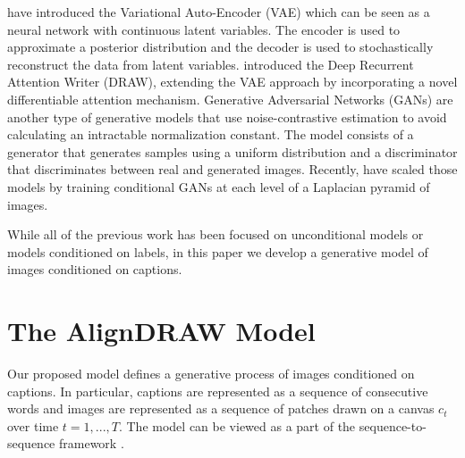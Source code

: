 \documentclass{article} %
\newcommand{\icaption}{{\bf{y}}}
\newcommand{\oimage}{{\bf{x}}}
\begin{document}
\cite{kingma_vae} have introduced the Variational Auto-Encoder (VAE) which can be seen as a neural network with continuous latent variables. The encoder is used to approximate a posterior distribution and the decoder is used to stochastically reconstruct the data from latent variables. 
\cite{gregor_draw} introduced the Deep Recurrent Attention Writer (DRAW), extending the VAE approach by incorporating a novel differentiable attention mechanism.
Generative Adversarial Networks (GANs) \citep{goodfellow_gan} are another type of generative models that use noise-contrastive estimation \citep{gutmann_nce} to avoid calculating an intractable normalization constant. The model consists of a generator that generates samples using a uniform distribution and a discriminator that discriminates between real and generated images. 
Recently, \cite{denton_lapgan} have scaled those models by training conditional GANs at each level of a Laplacian pyramid of images. 

While all of the previous work has been focused on unconditional models or models conditioned on labels, %
in this paper we develop a generative model of images conditioned on captions.

\section{The AlignDRAW Model}
\label{sec:model}
Our proposed model 
defines a generative process of images conditioned on captions. In particular, captions are represented as a sequence of consecutive words and images are represented as a sequence of patches drawn on a canvas $c_t$ over time $t=1,...,T$. The model can be viewed as a part of the sequence-to-sequence framework \citep{ilya_mt,cho_mt,nitish_video}.
\end{document}
